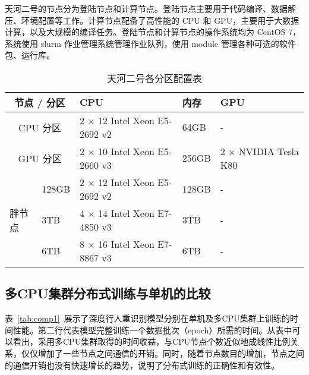 天河二号的节点分为登陆节点和计算节点。登陆节点主要用于代码编译、数据解压、环境配置等工作。计算节点配备了高性能的 CPU 和 GPU，主要用于大数据计算，以及大规模的编译任务。登陆节点和计算节点的操作系统均为 CentOS 7，系统使用 slurm 作业管理系统管理作业队列，使用 module 管理各种可选的软件包、运行库。

\begin{table}[!ht]
\centering
\caption{天河二号各分区配置表}
\label{tab:tianheconfig}
\begin{tabularx}{\textwidth}{p{}<{\centering}p{}<{\centering}p{}<{\centering}p{}<{\centering}p{}<{\centering}}
\toprule
\multicolumn{2}{c}{节点 / 分区}  & CPU                          & 内存    & GPU                  \\ \midrule
\multicolumn{2}{c}{CPU 分区}  & 2 $\times$ 12 Intel Xeon E5-2692 v2 & 64GB  & -                    \\
\multicolumn{2}{c}{GPU 分区}  & 2 $\times$ 10 Intel Xeon E5-2660 v3 & 256GB & 2 $\times$ NVIDIA Tesla K80 \\
\multirow{3}{*}{胖节点} & 128GB & 2 $\times$ 12 Intel Xeon E5-2692 v2 & 128GB & -                    \\
                        & 3TB   & 4 $\times$ 14 Intel Xeon E7-4850 v3 & 3TB   & -                    \\
                        & 6TB   & 8 $\times$ 16 Intel Xeon E7-8867 v3 & 6TB   & -                    \\ \bottomrule
\end{tabularx}
\end{table}

\subsection{多CPU集群分布式训练与单机的比较}

表~\ref{tab:comp1}~展示了深度行人重识别模型分别在单机及多CPU集群上训练的时间性能。第二行代表模型完整训练一个数据批次（epoch）所需的时间。从表中可以看出，采用多CPU集群取得的时间收益，与CPU节点个数近似地成线性比例关系，仅仅增加了一些节点之间通信的开销。同时，随着节点数目的增加，节点之间的通信开销也没有快速增长的趋势，说明了分布式训练的正确性和有效性。

